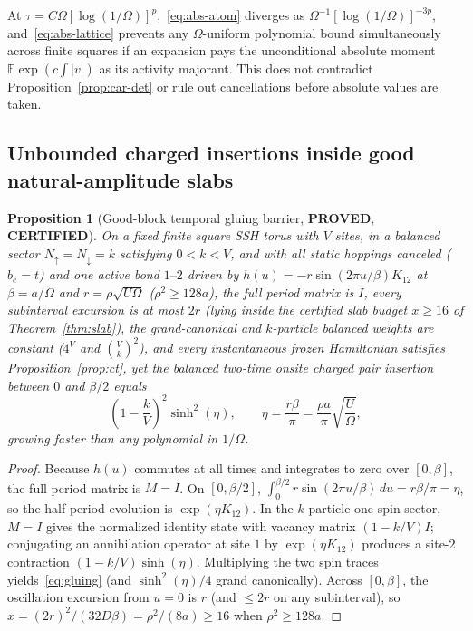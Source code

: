 \documentclass[11pt]{article}
\newtheorem{proposition}{Proposition}
\theoremstyle{remark}
\newcommand{\proved}{\textbf{PROVED}}
\newcommand{\certified}{\textbf{CERTIFIED}}
\begin{document}
At $\tau=C\Omega[\log(1/\Omega)]^p$,~\eqref{eq:abs-atom} diverges as $\Omega^{-1}[\log(1/\Omega)]^{-3p}$, and~\eqref{eq:abs-lattice} prevents any $\Omega$-uniform polynomial bound simultaneously across finite squares if an expansion pays the unconditional absolute moment $\mathbb E\exp(c\int|v|)$ as its activity majorant. This does not contradict Proposition~\ref{prop:car-det} or rule out cancellations before absolute values are taken.

\subsection{Unbounded charged insertions inside good natural-amplitude slabs}

\begin{proposition}[Good-block temporal gluing barrier, \proved, \certified]\label{prop:gluing}
On a fixed finite square SSH torus with $V$ sites, in a balanced sector $N_\uparrow=N_\downarrow=k$ satisfying $0<k<V$, and with all static hoppings canceled ($b_e=t$) and one active bond $1\text{--}2$ driven by $h(u)=-r\sin(2\pi u/\beta)K_{12}$ at $\beta=a/\Omega$ and $r=\rho\sqrt{U\Omega}$ ($\rho^2\ge 128a$), the full period matrix is $I$, every subinterval excursion is at most $2r$ (lying inside the certified slab budget $x\ge 16$ of Theorem~\ref{thm:slab}), the grand-canonical and $k$-particle balanced weights are constant ($4^V$ and $\binom{V}{k}^2$), and every instantaneous frozen Hamiltonian satisfies Proposition~\ref{prop:ct}, yet the balanced two-time onsite charged pair insertion between $0$ and $\beta/2$ equals
\begin{equation}\label{eq:gluing}
 \left(1-\frac{k}{V}\right)^2\sinh^2(\eta),\qquad \eta=\frac{r\beta}{\pi}=\frac{\rho a}{\pi}\sqrt{\frac{U}{\Omega}},
\end{equation}
growing faster than any polynomial in $1/\Omega$.
\end{proposition}

\begin{proof}
Because $h(u)$ commutes at all times and integrates to zero over $[0,\beta]$, the full period matrix is $M=I$. On $[0,\beta/2]$, $\int_0^{\beta/2}r\sin(2\pi u/\beta)\,du=r\beta/\pi=\eta$, so the half-period evolution is $\exp(\eta K_{12})$. In the $k$-particle one-spin sector, $M=I$ gives the normalized identity state with vacancy matrix $(1-k/V)I$; conjugating an annihilation operator at site $1$ by $\exp(\eta K_{12})$ produces a site-$2$ contraction $(1-k/V)\sinh(\eta)$. Multiplying the two spin traces yields~\eqref{eq:gluing} (and $\sinh^2(\eta)/4$ grand canonically). Across $[0,\beta]$, the oscillation excursion from $u=0$ is $r$ (and $\le 2r$ on any subinterval), so $x=(2r)^2/(32D\beta)=\rho^2/(8a)\ge 16$ when $\rho^2\ge 128a$.
\end{proof}
\end{document}
